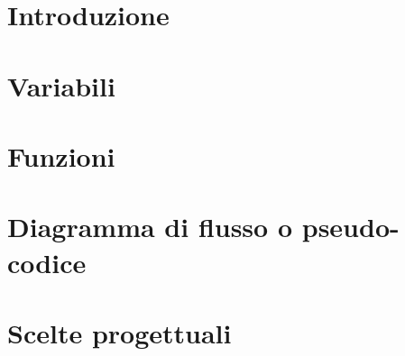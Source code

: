 \documentclass[a4paper,11pt]{article}
\title{
	\textbf{
		Elaborato Assembly \\ 
		\noindent\rule{6cm}{0.4pt} \\  %
		Architettura degli Elaboratori
	}
}
\author{
	\getenv{asm_rel_author1} \\
	\getenv{asm_rel_author2} \\	
	\getenv{asm_rel_author3}
}
\date{Anno 2020/2021}
\begin{document}


\null  %
\nointerlineskip  %
\vfill
\let\snewpage \newpage
\let\newpage \relax
\maketitle
\let \newpage \snewpage
\vfill 
\break %

\newpage


\tableofcontents
\newpage


\section{Introduzione}

\newpage


\section{Variabili}

\newpage


\section{Funzioni}

\newpage


\section{Diagramma di flusso o pseudo-codice}

\newpage


\section{Scelte progettuali}

\newpage
\end{document}
